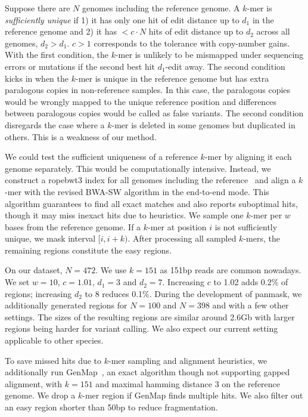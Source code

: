 \documentclass[webpdf,contemporary,large,namedate]{oup-authoring-template}%
\begin{document}
Suppose there are $N$ genomes including the reference genome.
A $k$-mer is \emph{sufficiently unique}
if 1) it has only one hit of edit distance up to $d_1$ in the reference genome
and 2) it has $<c\cdot N$ hits of edit distance up to $d_2$ across all genomes, $d_2>d_1$.
$c>1$ corresponds to the tolerance with copy-number gains.
With the first condition, the $k$-mer is unlikely to be mismapped under sequencing errors or mutations if the second best hit $d_1$-edit away.
The second condition kicks in when the $k$-mer is unique in the reference genome but has extra paralogous copies in non-reference samples.
In this case, the paralogous copies would be wrongly mapped to the unique reference position and
differences between paralogous copies would be called as false variants.
The second condition disregards the case where a $k$-mer is deleted in some genomes but duplicated in others.
This is a weakness of our method.

We could test the sufficient uniqueness of a reference $k$-mer by aligning it each genome separately.
This would be computationally intensive.
Instead, we construct a ropebwt3 index for all genomes including the reference~\citep{Li:2024ac}
and align a $k$-mer with the revised BWA-SW algorithm in the end-to-end mode.
This algorithm guarantees to find all exact matches and also reports suboptimal hits,
though it may miss inexact hits due to heuristics.
We sample one $k$-mer per $w$ bases from the reference genome.
If a $k$-mer at position $i$ is not sufficiently unique, we mask interval $[i,i+k)$.
After processing all sampled $k$-mers, the remaining regions constitute the easy regions.

On our dataset, $N=472$.
We use $k=151$ as 151bp reads are common nowadays.
We set $w=10$, $c=1.01$, $d_1=3$ and $d_2=7$.
Increasing $c$ to 1.02 adds 0.2\% of regions; increasing $d_2$ to 8 reduces 0.1\%.
During the development of panmask, we additionally generated regions for $N=100$ and $N=398$ and with a few other settings.
The sizes of the resulting regions are similar around 2.6Gb with larger regions being harder for variant calling.
We also expect our current setting applicable to other species.

To save missed hits due to $k$-mer sampling and alignment heuristics,
we additionally run GenMap~\citep{Pockrandt:2020aa}, an exact algorithm though not supporting gapped alignment, with $k=151$ and maximal hamming distance 3 on the reference genome.
We drop a $k$-mer region if GenMap finds multiple hits.
We also filter out an easy region shorter than 50bp to reduce fragmentation.
\end{document}
